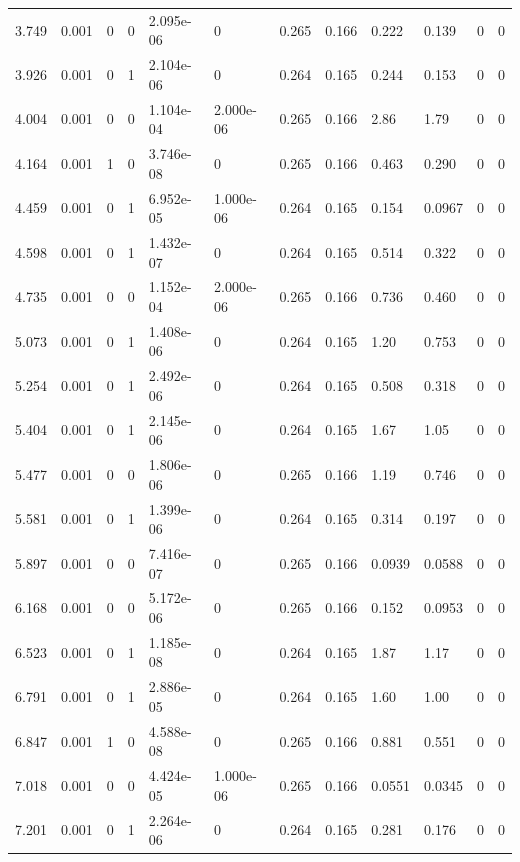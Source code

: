 \documentclass[preview]{standalone}
\begin{document}
{{\begin{tabular}{L{1.2cm}C{1.2cm} C{0.3cm}C{0.5cm} C{1.4cm}C{1.4cm} C{1.4cm}C{1.4cm} C{1.6cm}C{1.6cm} C{1.6cm}C{1.6cm}}
  3.749  &  0.001  & 0     &  0 &  2.095e-06  & 0  &  0.265&   0.166& 0.222 & 0.139   &  0 & 0  \\ 
  3.926  &  0.001  & 0     &  1 &  2.104e-06  & 0  &  0.264&   0.165& 0.244 & 0.153   &  0 & 0  \\ 
  4.004  &  0.001  & 0     &  0 &  1.104e-04  & 2.000e-06  &  0.265&   0.166& 2.86 & 1.79   &  0 & 0  \\ 
  4.164  &  0.001  & 1     &  0 &  3.746e-08  & 0  &  0.265&   0.166& 0.463 & 0.290   &  0 & 0  \\ 
  4.459  &  0.001  & 0     &  1 &  6.952e-05  & 1.000e-06  &  0.264&   0.165& 0.154 & 0.0967   &  0 & 0  \\ 
  4.598  &  0.001  & 0     &  1 &  1.432e-07  & 0  &  0.264&   0.165& 0.514 & 0.322   &  0 & 0  \\ 
  4.735  &  0.001  & 0     &  0 &  1.152e-04  & 2.000e-06  &  0.265&   0.166& 0.736 & 0.460   &  0 & 0  \\ 
  5.073  &  0.001  & 0     &  1 &  1.408e-06  & 0  &  0.264&   0.165& 1.20 & 0.753   &  0 & 0  \\ 
  5.254  &  0.001  & 0     &  1 &  2.492e-06  & 0  &  0.264&   0.165& 0.508 & 0.318   &  0 & 0  \\ 
  5.404  &  0.001  & 0     &  1 &  2.145e-06  & 0  &  0.264&   0.165& 1.67 & 1.05   &  0 & 0  \\ 
  5.477  &  0.001  & 0     &  0 &  1.806e-06  & 0  &  0.265&   0.166& 1.19 & 0.746   &  0 & 0  \\ 
  5.581  &  0.001  & 0     &  1 &  1.399e-06  & 0  &  0.264&   0.165& 0.314 & 0.197   &  0 & 0  \\ 
  5.897  &  0.001  & 0     &  0 &  7.416e-07  & 0  &  0.265&   0.166& 0.0939 & 0.0588   &  0 & 0  \\ 
  6.168  &  0.001  & 0     &  0 &  5.172e-06  & 0  &  0.265&   0.166& 0.152 & 0.0953   &  0 & 0  \\ 
  6.523  &  0.001  & 0     &  1 &  1.185e-08  & 0  &  0.264&   0.165& 1.87 & 1.17   &  0 & 0  \\ 
  6.791  &  0.001  & 0     &  1 &  2.886e-05  & 0  &  0.264&   0.165& 1.60 & 1.00   &  0 & 0  \\ 
  6.847  &  0.001  & 1     &  0 &  4.588e-08  & 0  &  0.265&   0.166& 0.881 & 0.551   &  0 & 0  \\ 
  7.018  &  0.001  & 0     &  0 &  4.424e-05  & 1.000e-06  &  0.265&   0.166& 0.0551 & 0.0345   &  0 & 0  \\ 
  7.201  &  0.001  & 0     &  1 &  2.264e-06  & 0  &  0.264&   0.165& 0.281 & 0.176   &  0 & 0  \\ 

\end{tabular}}}
\end{document}
